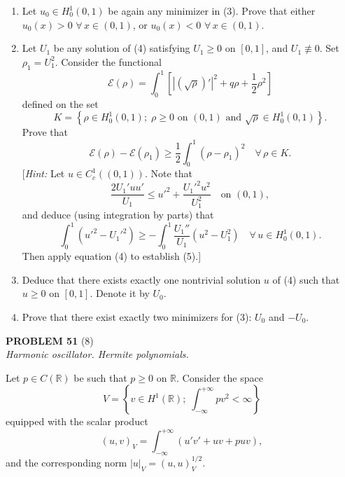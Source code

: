 \documentclass[12pt]{article}
\newcommand{\abs}[1]{\left|#1\right|}
\newcommand{\R}{\mathbb{R}}
\begin{document}
\begin{enumerate}
\item Let $u_0 \in H^1_0(0,1)$ be again any minimizer in (3). Prove that either
$u_0(x) > 0$ $\forall\, x \in (0,1)$, or $u_0(x) < 0$ $\forall\, x \in (0,1)$.
 
\noindent[\textit{Hint:} Check that $\abs{u_0(x)} > 0$ $\forall\, x \in (0,1)$.]
 
\item Let $U_1$ be any solution of (4) satisfying $U_1 \ge 0$ on $[0,1]$, and $U_1 \not\equiv 0$.
Set $\rho_1 = U_1^2$. Consider the functional
\[
\mathcal{E}(\rho) = \int_0^1 \left[\abs{(\sqrt{\rho})'}^2 + q\rho + \frac{1}{2}\rho^2\right]
\]
defined on the set
\[
K = \left\{\rho \in H^1_0(0,1);\; \rho \ge 0 \text{ on } (0,1) \text{ and } \sqrt{\rho} \in H^1_0(0,1)\right\}.
\]
Prove that
\begin{equation}\tag{5}
\mathcal{E}(\rho) - \mathcal{E}(\rho_1) \ge \frac{1}{2}\int_0^1 (\rho - \rho_1)^2 \quad \forall\, \rho \in K.
\end{equation}
[\textit{Hint:} Let $u \in C^1_c((0,1))$. Note that
\[
\frac{2U_1' u u'}{U_1} \le u'^2 + \frac{U_1'^2 u^2}{U_1^2} \quad \text{on } (0,1),
\]
and deduce (using integration by parts) that
\[
\int_0^1 (u'^2 - U_1'^2) \ge -\int_0^1 \frac{U_1''}{U_1}(u^2 - U_1^2) \quad \forall\, u \in H^1_0(0,1).
\]
Then apply equation (4) to establish (5).]
 
\item Deduce that there exists exactly one nontrivial solution $u$ of (4) such that
$u \ge 0$ on $[0,1]$. Denote it by $U_0$.
 
 
\item Prove that there exist exactly two minimizers for (3): $U_0$ and $-U_0$.
\end{enumerate}
 
\bigskip
 
\noindent\textbf{PROBLEM 51} (8)\\[4pt]
\textit{Harmonic oscillator. Hermite polynomials.}
 
\medskip
 
Let $p \in C(\R)$ be such that $p \ge 0$ on $\R$. Consider the space
\[
V = \left\{v \in H^1(\R);\; \int_{-\infty}^{+\infty} pv^2 < \infty\right\}
\]
equipped with the scalar product
\[
(u,v)_V = \int_{-\infty}^{+\infty} (u'v' + uv + puv),
\]
and the corresponding norm $\abs{u}_V = (u,u)_V^{1/2}$.
 
\end{document}
